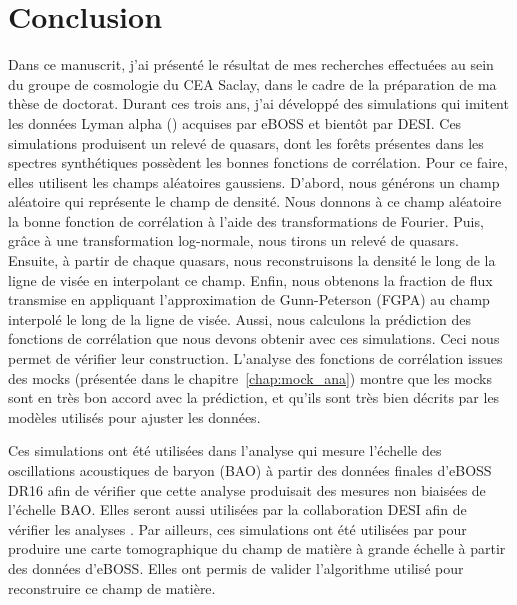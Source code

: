 \chapter{Conclusion}
\thispagestyle{fancy}

Dans ce manuscrit, j'ai présenté le résultat de mes recherches effectuées au sein du groupe de cosmologie du CEA Saclay, dans le cadre de la préparation de ma thèse de doctorat.
Durant ces trois ans, j'ai développé des simulations qui imitent les données Lyman alpha (\lya{}) acquises par eBOSS et bientôt par DESI.
Ces simulations produisent un relevé de quasars, dont les forêts \lya{} présentes dans les spectres synthétiques possèdent les bonnes fonctions de corrélation.
Pour ce faire, elles utilisent les champs aléatoires gaussiens. D'abord, nous générons un champ aléatoire qui représente le champ de densité. Nous donnons à ce champ aléatoire la bonne fonction de corrélation à l'aide des transformations de Fourier.
Puis, grâce à une transformation log-normale, nous tirons un relevé de quasars. Ensuite, à partir de chaque quasars, nous reconstruisons la densité le long de la ligne de visée en interpolant ce champ. Enfin, nous obtenons la fraction de flux transmise en appliquant l'approximation de Gunn-Peterson (FGPA) au champ interpolé le long de la ligne de visée.
Aussi, nous calculons la prédiction des fonctions de corrélation que nous devons obtenir avec ces simulations. Ceci nous permet de vérifier leur construction.
L'analyse des fonctions de corrélation issues des mocks (présentée dans le chapitre~\ref{chap:mock_ana}) montre que les mocks sont en très bon accord avec la prédiction, et qu'ils sont très bien décrits par les modèles utilisés pour ajuster les données.

Ces simulations ont été utilisées dans l'analyse qui mesure l'échelle des oscillations acoustiques de baryon (BAO) à partir des données finales d'eBOSS DR16 \autocite{DuMasdesBourboux2020} afin de vérifier que cette analyse produisait des mesures non biaisées de l'échelle BAO. Elles seront aussi utilisées par la collaboration DESI afin de vérifier les analyses \lya{}.
Par ailleurs, ces simulations ont été utilisées par \textcite{Ravoux2020} pour produire une carte tomographique du champ de matière à grande échelle à partir des données d'eBOSS. Elles ont permis de valider l'algorithme utilisé pour reconstruire ce champ de matière.

